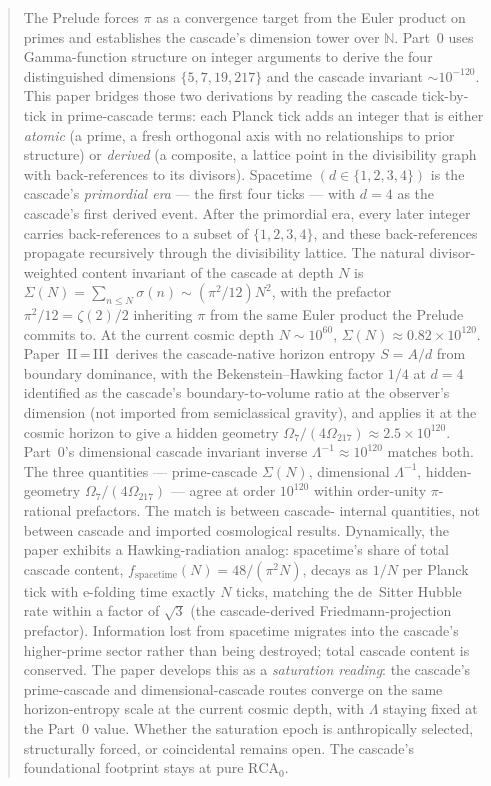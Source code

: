 \documentclass[11pt,a4paper]{article}
\begin{document}
\begin{abstract}
The Prelude forces $\pi$ as a convergence target from the Euler
product on primes and establishes the cascade's dimension tower over
$\mathbb{N}$. Part~0 uses Gamma-function structure on integer
arguments to derive the four distinguished dimensions $\{5, 7, 19,
217\}$ and the cascade invariant $\sim 10^{-120}$. This paper bridges
those two derivations by reading the cascade tick-by-tick in
prime-cascade terms: each Planck tick adds an integer that is either
\emph{atomic} (a prime, a fresh orthogonal axis with no relationships
to prior structure) or \emph{derived} (a composite, a lattice point
in the divisibility graph with back-references to its divisors).
Spacetime $(d \in \{1, 2, 3, 4\})$ is the cascade's
\emph{primordial era} --- the first four ticks --- with $d = 4$ as
the cascade's first derived event. After the primordial era, every
later integer carries back-references to a subset of $\{1, 2, 3, 4\}$,
and these back-references propagate recursively through the
divisibility lattice. The natural divisor-weighted content invariant
of the cascade at depth $N$ is $\Sigma(N) = \sum_{n \leq N} \sigma(n)
\sim (\pi^2/12) N^2$, with the prefactor $\pi^2/12 = \zeta(2)/2$
inheriting $\pi$ from the same Euler product the Prelude commits to.
At the current cosmic depth $N \sim 10^{60}$, $\Sigma(N) \approx
0.82 \times 10^{120}$. Paper~II\,=\,III\,\cite{part23} derives the
cascade-native horizon entropy $S = A/d$ from boundary dominance,
with the Bekenstein--Hawking factor $1/4$ at $d = 4$ identified as
the cascade's boundary-to-volume ratio at the observer's dimension
(not imported from semiclassical gravity), and applies it at the
cosmic horizon to give a hidden geometry
$\Omega_7/(4\Omega_{217}) \approx 2.5 \times 10^{120}$. Part~0's
dimensional cascade invariant inverse $\Lambda^{-1} \approx 10^{120}$
matches both. The three quantities --- prime-cascade $\Sigma(N)$,
dimensional $\Lambda^{-1}$, hidden-geometry
$\Omega_7/(4\Omega_{217})$ --- agree at order $10^{120}$ within
order-unity $\pi$-rational prefactors. The match is between cascade-
internal quantities, not between cascade and imported cosmological
results. Dynamically, the paper exhibits a Hawking-radiation analog:
spacetime's share of total cascade content,
$f_{\mathrm{spacetime}}(N) = 48/(\pi^2 N)$, decays as $1/N$ per
Planck tick with e-folding time exactly $N$ ticks, matching the
de~Sitter Hubble rate within a factor of $\sqrt{3}$ (the
cascade-derived Friedmann-projection prefactor). Information lost
from spacetime migrates into the cascade's higher-prime sector
rather than being destroyed; total cascade content is conserved.
The paper develops this as a \emph{saturation reading}: the
cascade's prime-cascade and dimensional-cascade routes converge on
the same horizon-entropy scale at the current cosmic depth, with
$\Lambda$ staying fixed at the Part~0 value. Whether the saturation
epoch is anthropically selected, structurally forced, or coincidental
remains open. The cascade's foundational footprint stays at pure
$\mathrm{RCA}_0$.
\end{abstract}
\end{document}
